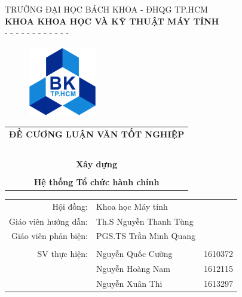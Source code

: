 \documentclass[12pt, a4paper]{report}
\begin{document}
\usetikzlibrary{calc}

\begin{titlepage}
\begin{center}
TRƯỜNG ĐẠI HỌC BÁCH KHOA - ĐHQG TP.HCM\\
\textbf{KHOA KHOA HỌC VÀ KỸ THUẬT MÁY TÍNH}\\
- - - - - - - - - - - -
\end{center}

\vspace{0.5cm}
\begin{figure}[H]
\begin{center}
\includegraphics[width=3cm]{img/LogoBK.jpg}
\end{center}
\end{figure}
\vspace{0.5cm}

\begin{center}
\begin{tabular}{c}
\multicolumn{1}{c}{\textbf{{\Large ĐỀ CƯƠNG LUẬN VĂN TỐT NGHIỆP }}}\\
~~\\
\hline
\multicolumn{1}{c}{\textbf{{\Large Xây dựng}}}\\\\
\textbf{{\Large Hệ thống Tổ chức hành chính}}\\
\hline
\end{tabular}
\end{center}

\vspace{1cm}
\begin{table}[H]
\begin{tabular}{rlr}
\hspace{4cm} Hội đồng: & Khoa học Máy tính&\\
\hspace{4cm} Giáo viên hướng dẫn: & Th.S Nguyễn Thanh Tùng&\\
\hspace{4cm} Giáo viên phản biện: & PGS.TS Trần Minh Quang &\\
\\
\hspace{4cm} SV thực hiện: & Nguyễn Quốc Cường & 1610372\\
& Nguyễn Hoàng Nam & 1612115\\
& Nguyễn Xuân Thi & 1613297\\


\end{tabular}
\end{table}
\end{titlepage}
\end{document}
